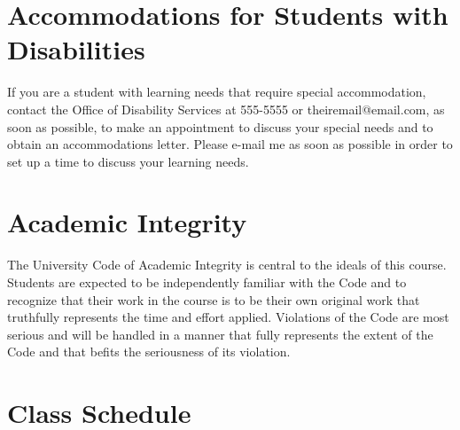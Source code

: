\documentclass[letterpaper]{inzane_syllabus} %
\begin{document}
\vspace{0.5cm}
\section{Accommodations for Students with Disabilities}

If you are a student with learning needs that require special accommodation, contact the Office of Disability Services at 555-5555 or theiremail@email.com, as soon as possible, to make an appointment to discuss your special needs and to obtain an accommodations letter.  Please e-mail me as soon as possible in order to set up a time to discuss your learning needs.

\vspace{0.5cm}
\section{Academic Integrity}

The University Code of Academic Integrity is central to the ideals of this course. Students are expected to be independently familiar with the Code and to recognize that their work in the course is to be their own original work that truthfully represents the time and effort applied.  Violations of the Code are most serious and will be handled in a manner that fully represents the extent of the Code and that befits the seriousness of its violation.\\

\newpage
\makeFullPage
\section{Class Schedule}
\end{document}
